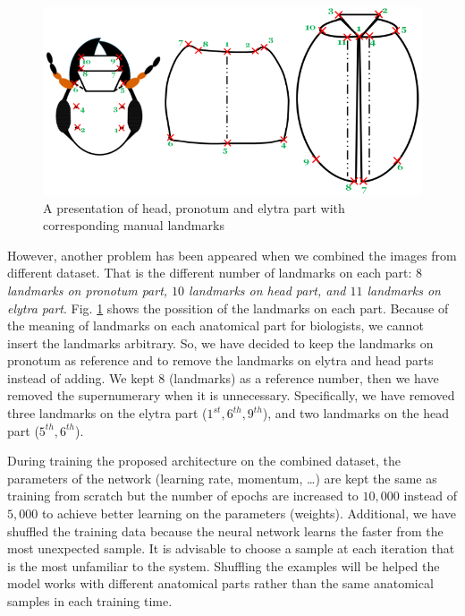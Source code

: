 \documentclass[review]{elsarticle}
\begin{document}
\begin{figure}[htbp]
	\centerline{\includegraphics[scale=0.5]{images/merge}}
	\caption{A presentation of head, pronotum and elytra part with
corresponding manual landmarks}
	\label{figmerge}
\end{figure}

However, another problem has been appeared when we combined the images from different dataset. That is the different number of landmarks on each part: \textit{$8$ landmarks on pronotum part, $10$ landmarks on head part, and $11$ landmarks on elytra part}. Fig. \ref{figmerge} shows the possition of the landmarks on each part. Because of the meaning of landmarks on each anatomical part for biologists, we cannot insert the landmarks arbitrary. So,  we have decided to keep the landmarks on pronotum as reference and to remove the landmarks on elytra and head parts instead of adding. We kept $8$ (landmarks) as a reference number, then we have removed the supernumerary when it is unnecessary. Specifically, we have removed three landmarks on the elytra part ($1^{st}, 6^{th}, 9^{th}$), and two landmarks on the head part ($5^{th}, 6^{th}$). 

During training the proposed architecture on the combined dataset, the parameters of the network (learning rate, momentum, \ldots) are kept the same as training from scratch but the number of epochs are increased to $10, 000$ instead of $5, 000$ to achieve better learning on the parameters (weights). Additional, we have shuffled the training data because the neural network learns the faster from the most unexpected sample. It is advisable to choose a sample at each iteration that is the most unfamiliar to the system. Shuffling the examples will be helped the model works with different anatomical parts rather than the same anatomical samples in each training time.
\end{document}
